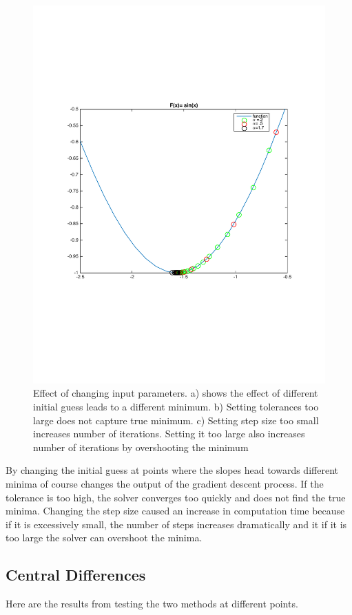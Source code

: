 \documentclass[10pt,twocolumn]{article}
\begin{document}
\begin{figure}[H]
\includegraphics[scale=.3]{1DsinStepSize.pdf}
\caption{ Effect of changing input parameters. a) shows the effect of different initial guess leads to a different minimum. b) Setting tolerances too large does not capture true minimum. c) Setting step size too small increases number of iterations. Setting it too large also increases number of iterations by overshooting the minimum}
\end{figure}
By changing the initial guess at points where the slopes head towards different minima of course changes the output of the gradient descent process. If the tolerance is too high, the solver converges too quickly and does not find the true minima.  Changing the step size caused an increase in computation time because if it is excessively small, the number of steps increases dramatically and it if it is too large the solver can overshoot the minima. 

\subsection*{ Central Differences}
Here are the results from testing the two methods at different points.
\end{document}
